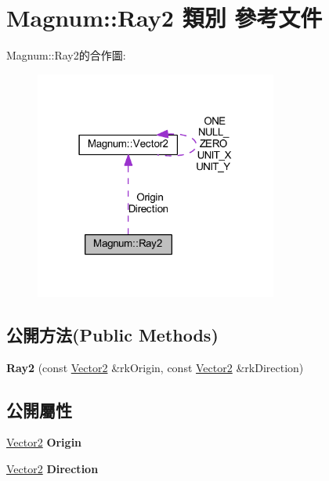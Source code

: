 \hypertarget{class_magnum_1_1_ray2}{}\section{Magnum\+:\+:Ray2 類別 參考文件}
\label{class_magnum_1_1_ray2}


Magnum\+:\+:Ray2的合作圖\+:\nopagebreak
\begin{figure}[H]
\begin{center}
\leavevmode
\includegraphics[width=226pt]{class_magnum_1_1_ray2__coll__graph}
\end{center}
\end{figure}
\subsection*{公開方法(Public Methods)}
\begin{DoxyCompactItemize}
\item 
{\bfseries Ray2} (const \hyperlink{class_magnum_1_1_vector2}{Vector2} \&rk\+Origin, const \hyperlink{class_magnum_1_1_vector2}{Vector2} \&rk\+Direction)\hypertarget{class_magnum_1_1_ray2_a4c323ebc28b051bdbceecc4839a6696d}{}\label{class_magnum_1_1_ray2_a4c323ebc28b051bdbceecc4839a6696d}

\end{DoxyCompactItemize}
\subsection*{公開屬性}
\begin{DoxyCompactItemize}
\item 
\hyperlink{class_magnum_1_1_vector2}{Vector2} {\bfseries Origin}\hypertarget{class_magnum_1_1_ray2_a071fd61bb5b19ee3bb0a8f1c84097ed7}{}\label{class_magnum_1_1_ray2_a071fd61bb5b19ee3bb0a8f1c84097ed7}

\item 
\hyperlink{class_magnum_1_1_vector2}{Vector2} {\bfseries Direction}\hypertarget{class_magnum_1_1_ray2_adb20c013c4b46d1e5006752cbf10ed4d}{}\label{class_magnum_1_1_ray2_adb20c013c4b46d1e5006752cbf10ed4d}

\end{DoxyCompactItemize}


